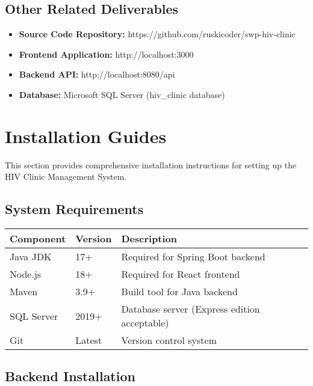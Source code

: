 \documentclass[12pt,a4paper]{article}
\begin{document}
\subsection{Other Related Deliverables}

\begin{itemize}
    \item \textbf{Source Code Repository:} https://github.com/ruskicoder/swp-hiv-clinic
    \item \textbf{Frontend Application:} http://localhost:3000
    \item \textbf{Backend API:} http://localhost:8080/api
    \item \textbf{Database:} Microsoft SQL Server (hiv\_clinic database)
\end{itemize}

\section{Installation Guides}

This section provides comprehensive installation instructions for setting up the HIV Clinic Management System.

\subsection{System Requirements}

\begin{longtable}{|p{3cm}|p{3cm}|p{8cm}|}
\hline
\textbf{Component} & \textbf{Version} & \textbf{Description} \\
\hline
Java JDK & 17+ & Required for Spring Boot backend \\
\hline
Node.js & 18+ & Required for React frontend \\
\hline
Maven & 3.9+ & Build tool for Java backend \\
\hline
SQL Server & 2019+ & Database server (Express edition acceptable) \\
\hline
Git & Latest & Version control system \\
\hline
\end{longtable}

\subsection{Backend Installation}
\end{document}
